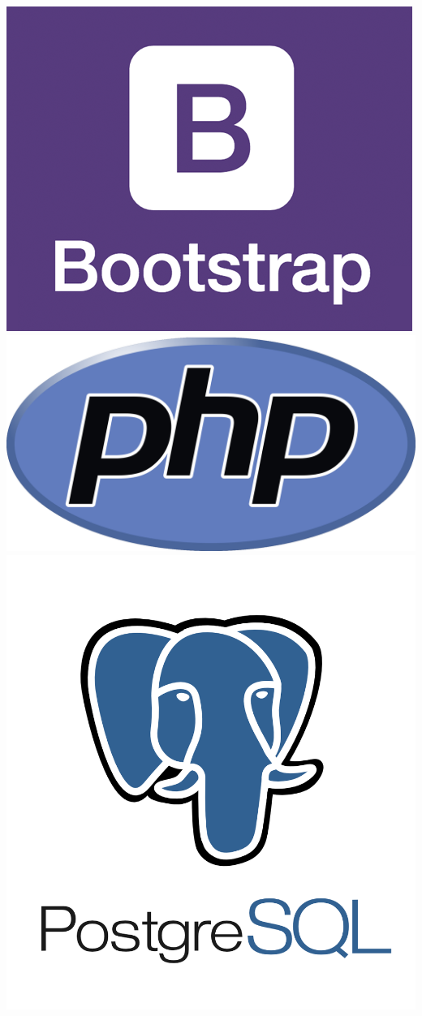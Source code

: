 \documentclass[dvipsnames,a2paper]{paper}
\begin{document}
\hspace{1cm}
\includegraphics[scale=0.28]{./images/affiche/bootstrap_logo.png}
\hspace{1cm}
\includegraphics[scale=0.1]{./images/affiche/phplogo.png}
\hspace{1cm}
\includegraphics[scale=0.43]{./images/affiche/postgresql-logo.png}
\end{document}
